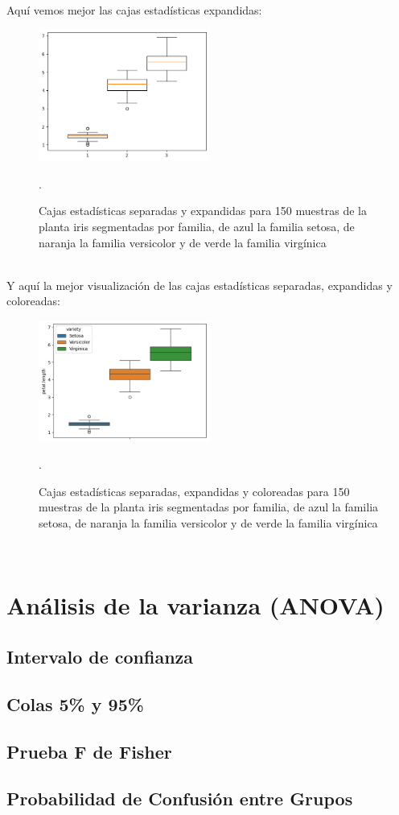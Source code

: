 \documentclass{article}
\begin{document}
\hfill\hfill\\
Aquí vemos mejor las cajas estadísticas expandidas:
\begin{figure}[h]
    \centering
    \includegraphics[width=0.5\textwidth]{figures/box6.png}
    \captionsetup{width=0.8\textwidth}
    \caption{Cajas estadísticas separadas y expandidas para 150 muestras de la planta iris segmentadas por familia, de azul la familia setosa, de naranja la familia versicolor y de verde la familia virgínica}.
    \label{fig:box6}
\end{figure}
\\
Y aquí la mejor visualización de las cajas estadísticas separadas, expandidas y coloreadas:
\begin{figure}[h]
    \centering
    \includegraphics[width=0.5\textwidth]{figures/box7.png}
    \captionsetup{width=0.8\textwidth}
    \caption{Cajas estadísticas separadas, expandidas y coloreadas para 150 muestras de la planta iris segmentadas por familia, de azul la familia setosa, de naranja la familia versicolor y de verde la familia virgínica}.
    \label{fig:box7}
\end{figure}
\\

\section{Análisis de la varianza (ANOVA)}

\subsection{Intervalo de confianza}

\subsection{Colas 5\% y 95\%}

\subsection{Prueba F de Fisher}

\subsection{Probabilidad de Confusión entre Grupos}
    
\end{document}
